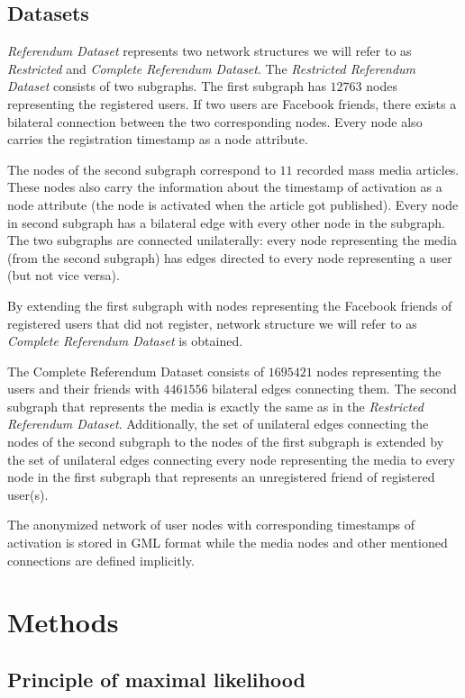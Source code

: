 \documentclass[times, utf8, zavrsni]{fer}
\begin{document}
\section{Datasets}
\emph{Referendum Dataset} represents two network structures we will refer    to as  \emph{Restricted} and \emph{Complete Referendum Dataset}. 
The \emph{Restricted Referendum Dataset} consists of two subgraphs. The first subgraph has $12763$ nodes representing the registered users. If two users are Facebook friends, there exists a bilateral connection between the two corresponding nodes. Every node also carries the  registration timestamp as a node attribute. 

The nodes of the second subgraph correspond to $11$ recorded mass media articles. These nodes also carry the information about the timestamp of activation as a node attribute (the node is activated when the article got published). Every node in second subgraph has a bilateral edge with every other node in the subgraph. The two subgraphs are connected unilaterally: every node  representing the media (from the  second subgraph) has edges directed to every node representing a user (but not vice versa). 

By extending the first subgraph with nodes representing the Facebook friends of registered users that did not  register, network structure we will refer to as \emph{Complete  Referendum Dataset} is obtained. 

The Complete Referendum Dataset consists of $1695421$ nodes representing the users and their friends with $4461556$ bilateral edges connecting them. The second subgraph that represents the media is exactly the same as in the \emph{Restricted Referendum Dataset}. Additionally, the set of  unilateral edges connecting  the nodes of the second subgraph to the nodes of the first subgraph is extended by the set of unilateral edges connecting every node representing the media to every node in the first subgraph that represents an unregistered friend of registered user(s).

The anonymized network of user nodes with corresponding timestamps of activation is stored in GML format \cite{gml} while the media nodes and other mentioned connections are defined implicitly.
  
\chapter{Methods}
\section{Principle of maximal likelihood}
\end{document}
